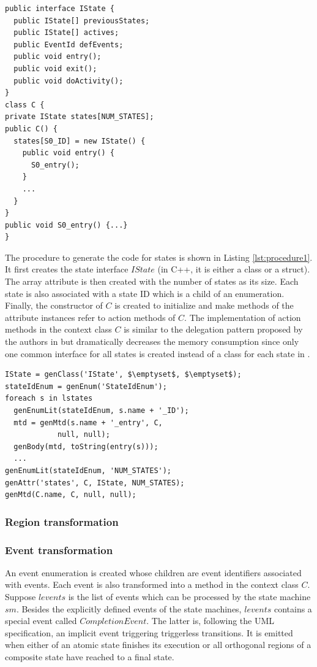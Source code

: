 \begin{lstlisting}[mathescape=true, caption=IState interface and annonymous sub-classes in Java, label=lst:IStateJava, frame=single]
public interface IState {
  public IState[] previousStates; 
  public IState[] actives;
  public EventId defEvents;
  public void entry();
  public void exit();
  public void doActivity();
}
class C {
private IState states[NUM_STATES];
public C() {
  states[S0_ID] = new IState() {
    public void entry() {
      S0_entry();
    }
    ...
  }
}
public void S0_entry() {...}
}
\end{lstlisting}

The procedure to generate the code for states is shown in Listing \ref{lst:procedure1}. It first creates the state interface $IState$ (in C++, it is either a class or a struct). The array attribute is then created with the number of states as its size. Each state is also associated with a state ID which is a child of an enumeration. Finally, the constructor of $C$ is created to initialize and make methods of the attribute instances refer to  action methods of $C$. The implementation of action methods in the context class $C$ is similar to the delegation pattern proposed by the authors in \cite{Niaz2004} but dramatically decreases the memory consumption since only one common interface for all states is created instead of a class for each state in \cite{Niaz2004}.

\begin{lstlisting}[mathescape=true, caption=Procedure to create code for states, label=lst:procedure1, frame=single]
IState = genClass('IState', $\emptyset$, $\emptyset$);
stateIdEnum = genEnum('StateIdEnum');
foreach s in lstates
  genEnumLit(stateIdEnum, s.name + '_ID');
  mtd = genMtd(s.name + '_entry', C, 
			null, null);
  genBody(mtd, toString(entry(s)));
  ...
genEnumLit(stateIdEnum, 'NUM_STATES');  
genAttr('states', C, IState, NUM_STATES); 
genMtd(C.name, C, null, null);
\end{lstlisting}

\subsubsection{Region transformation}


\subsubsection{Event transformation}
An event enumeration  is created whose children are event identifiers associated with events. Each event is also transformed into a method in the context class $C$. Suppose $levents$ is the list of events which can be processed by the state machine $sm$. Besides the explicitly defined events of the state machines, $levents$ contains a special event called $CompletionEvent$. The latter is, following the UML specification, an implicit event triggering triggerless transitions. It is emitted when either  of an atomic state finishes its execution or all orthogonal regions of a composite state have reached to a final state. 

